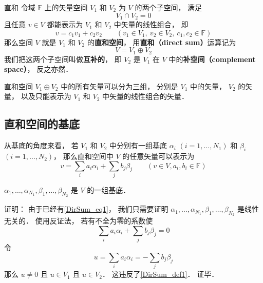 
\begin{issues}
\issueTODO
\end{issues}

\begin{definition}{直和}\label{DirSum_def1}
令域 $\mathbb F$ 上的矢量空间 $V_1$ 和 $V_2$ 为 $V$ 的两个子空间， 满足
\begin{equation}
V_1 \cap V_2 = \qty{0}
\end{equation}
且任意 ${v} \in V$ 都能表示为 $V_1$ 和 $V_2$ 中矢量的线性组合， 即
\begin{equation}
{v} = c_1 {v_1} + c_2 {v_2}
\qquad
({v_1} \in V_1,\ {v_2} \in V_2,\ c_1, c_2 \in \mathbb F)
\end{equation}
那么空间 $V$ 就是 $V_1$ 和 $V_2$ 的\textbf{直和空间}， 用\textbf{直和（direct sum）}运算记为
\begin{equation}
V = V_1 \oplus V_2
\end{equation}
我们把这两个子空间叫做\textbf{互补的}， 即 $V_2$ 是 $V_1$ 在 $V$ 中的\textbf{补空间（complement space）}， 反之亦然．
\end{definition}

直和空间 $V_1 \oplus V_2$ 中的所有矢量可以分为三组， 分别是 $V_1$ 中的矢量， $V_2$ 的矢量， 以及只能表示为 $V_1$ 和 $V_2$ 中矢量的线性组合的矢量．

\subsection{直和空间的基底}
从基底的角度来看， 若 $V_1$ 和 $V_2$ 中分别有一组基底 ${\alpha_i}$ $(i = 1, \dots, N_1)$ 和 ${\beta_i}$ $(i = 1, \dots, N_2)$， 那么直和空间中 $V$ 的任意矢量可以表示为
\begin{equation}\label{DirSum_eq1}
{v} = \sum_i a_i {\alpha_i} + \sum_j b_j {\beta_j} \qquad (v\in V, a_i, b_i \in \mathbb F)
\end{equation}
\begin{theorem}{}\label{DirSum_the1}
$\alpha_1, \dots, \alpha_{N_1}, \beta_1, \dots, \beta_{N_2}$ 是 $V$ 的一组基底．
\end{theorem}

证明： 由于已经有\autoref{DirSum_eq1}， 我们只需要证明 $\alpha_1, \dots, \alpha_{N_1}, \beta_1, \dots, \beta_{N_2}$ 是线性无关的． 使用反证法， 若有不全为零的系数使
\begin{equation}
\sum_i a_i {\alpha_i} + \sum_j b_j {\beta_j} = 0
\end{equation}
令
\begin{equation}
u = \sum_i a_i {\alpha_i} = -\sum_j b_j {\beta_j}
\end{equation}
那么 $u \ne 0$ 且 $u \in V_1$ 且 $u \in V_2$． 这违反了\autoref{DirSum_def1}． 证毕．

